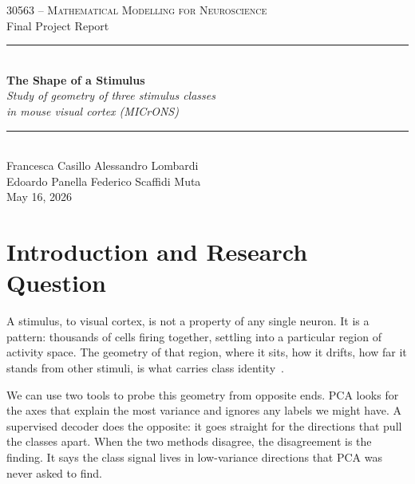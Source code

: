 \documentclass[11pt,a4paper]{article}
\begin{document}
\begin{titlepage}
  \centering
  \vspace*{\fill}

  {\small \textsc{30563 -- Mathematical Modelling for Neuroscience}}\\[0.5em]
  {\small Final Project Report}\\[3em]

  \rule{0.6\textwidth}{0.4pt}\\[1.4em]
  {\Huge\bfseries The Shape of a Stimulus}\\[1em]
  {\large\itshape Study of geometry of three stimulus classes\\in mouse visual cortex (MICrONS)}\\[1.4em]
  \rule{0.6\textwidth}{0.4pt}\\[3em]

  {\normalsize
    Francesca Casillo \quad Alessandro Lombardi\\[0.3em]
    Edoardo Panella \quad Federico Scaffidi Muta
  }\\[2.5em]

  {\small May 16, 2026}

  \vspace*{\fill}
\end{titlepage}

\section{Introduction and Research Question}
A stimulus, to visual cortex, is not a property of any single neuron. It is a pattern: thousands of cells firing together, settling into a particular region of activity space. The geometry of that region, where it sits, how it drifts, how far it stands from other stimuli, is what carries class identity~\cite{dayan2001}.

We can use two tools to probe this geometry from opposite ends. PCA looks for the axes that explain the most variance and ignores any labels we might have. A supervised decoder does the opposite: it goes straight for the directions that pull the classes apart. When the two methods disagree, the disagreement is the finding. It says the class signal lives in low-variance directions that PCA was never asked to find.
\end{document}
